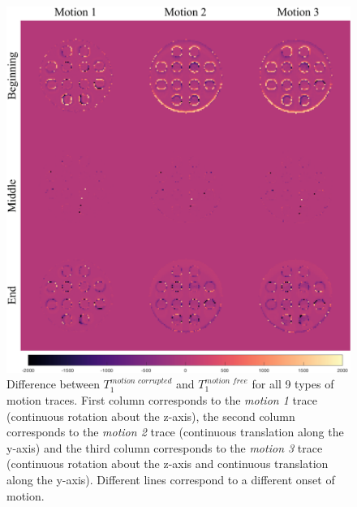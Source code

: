\begin{figure}[ht]
    \centering
    \includegraphics[width=1\textwidth]{images/mrf/T1SimuMinusT1Real}
    \caption{Difference between $T_1^{motion \, \, corrupted}$ and $T_1^{motion \, \, free}$ for all 9 types of motion traces. First column corresponds to the \textit{motion 1} trace (continuous rotation about the z-axis), the second column corresponds to the \textit{motion 2} trace (continuous translation along the y-axis) and the third column corresponds to the \textit{motion 3} trace (continuous rotation about the z-axis and continuous translation along the y-axis). Different lines correspond to a different onset of motion.}
    \label{fig:T1SimuMinusT1Real}
\end{figure}

